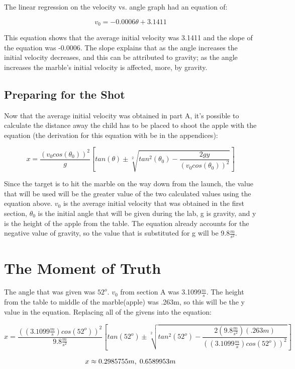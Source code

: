 \documentclass[aps,letterpaper,11pt]{revtex4}
\begin{document}
\newpage

The linear regression on the velocity vs. angle graph had an equation of:

$$ v_0=-0.0006\theta+3.1411$$ 

This equation shows that the average initial velocity was 3.1411 and the slope of the equation was -0.0006. The slope explains that as the angle increases the initial velocity decreases, and this can be attributed to gravity; as the angle increases the marble's initial velocity is affected, more, by gravity. 

\subsection{Preparing for the Shot}

 Now that the average initial velocity was obtained in part A, it's possible to calculate the distance away the child has to be placed to shoot the apple with the equation (the derivation for this equation with be in the appendices):
 
 $$ x=\frac{(v_0cos(\theta_0))^2}{g}[tan(\theta)\pm\sqrt[2]{tan^2(\theta_0)-\frac{2gy}{(v_0cos(\theta_0))^2}}]$$
 
 Since the target is to hit the marble on the way down from the launch, the value that will be used will be the greater value of the two calculated values using the equation above. $v_0$ is the average initial velocity that was obtained in the first section, $\theta_0$ is the initial angle that will be given during the lab, g is gravity, and y is the height of the apple from the table. The equation already accounts for the negative value of gravity, so the value that is substituted for g will be 9.8$\frac{m}{s^2}$. 
 
 \section{The Moment of Truth}
 
 The angle that was given was $52^o$. $v_0$ from section A was 3.1099$\frac{m}{s}$. The height from the table to middle of the marble(apple) was .263m, so this will be the y value in the equation. Replacing all of the givens into the equation:
 
$$ x=\frac{((3.1099\frac{m}{s})cos(52^o))^2}{9.8\frac{m}{s^2}}[tan(52^o)\pm\sqrt[2]{tan^2(52^o)-\frac{2(9.8\frac{m}{s^2})(.263m)}{((3.1099\frac{m}{s})cos(52^o))^2}}]$$

\[ x \approx 0.2985755m,\hspace{1mm} 0.6589953m\]
\end{document}
